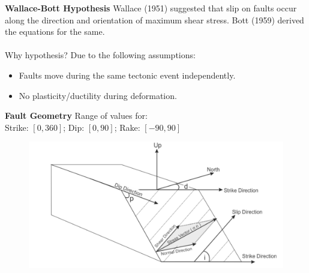\documentclass[11pt]{beamer}
\newcommand{\hl}[1]{\textcolor{myhl}{#1}}
\begin{document}
\begin{frame}{\textbf{Wallace-Bott Hypothesis}}
    Wallace (1951) suggested that \hl{slip on faults occur along the direction and orientation of maximum shear stress}. Bott (1959) derived the equations for the same.
    \\~\\
    Why hypothesis? Due to the following assumptions:
    \begin{itemize}
        \item Faults move during the same tectonic event independently.
        \item No plasticity/ductility during deformation.
    \end{itemize}
\end{frame}

\begin{frame}{\textbf{Fault Geometry}}
    Range of values for: \\
    Strike: $[0,360]$; Dip: $[0,90]$; Rake: $[-90,90]$

    \begin{figure}
        \includegraphics[width=1\linewidth]{images/fault}
    \end{figure}
\end{frame}
\end{document}
